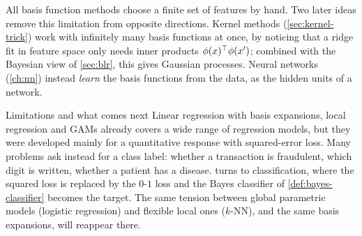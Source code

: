 \begin{remark}
All basis function methods choose a finite set of features by hand. Two later ideas remove this limitation from opposite directions. Kernel methods (\cref{sec:kernel-trick}) work with infinitely many basis functions at once, by noticing that a ridge fit in feature space only needs inner products $\phi(x)^{\top}\phi(x')$; combined with the Bayesian view of \cref{sec:blr}, this gives Gaussian processes. Neural networks (\cref{ch:nn}) instead \emph{learn} the basis functions from the data, as the hidden units of a network.
\end{remark}

\begin{notebox}{Limitations and what comes next}
Linear regression with basis expansions, local regression and GAMs already covers a wide range of regression models, but they were developed mainly for a quantitative response with squared-error loss. Many problems ask instead for a class label: whether a transaction is fraudulent, which digit is written, whether a patient has a disease.  turns to classification, where the squared loss is replaced by the $0$-$1$ loss and the Bayes classifier of \cref{def:bayes-classifier} becomes the target. The same tension between global parametric models (logistic regression) and flexible local ones ($k$-NN), and the same basis expansions, will reappear there.
\end{notebox}
